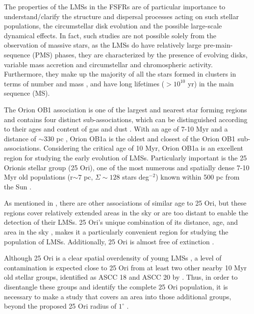 \documentclass[12pt]{article}
\begin{document}
The properties of the LMSs in the FSFRs are of particular importance to understand/clarify the structure and dispersal processes acting on such stellar populations, the circumstellar disk evolution and the possible large-scale dynamical effects. In fact, such studies are not possible solely from the observation of massive stars, as the LMSs do have relatively large pre-main-sequence (PMS) phases, they are characterized by the presence of evolving disks, variable mass accretion and circumstellar and chromospheric activity. Furthermore, they make up the majority of all the stars formed in clusters in terms of number and mass \citep[e.g.,][]{Bastian2010}, and have long lifetimes ($>10^{10}$ yr) in the main sequence (MS).

The Orion OB1 association is one of the largest and nearest star forming regions \citep[e.g. ][]{Genzel-Stutzki1989,Bally2008,Briceno2008} and contains four distinct sub-associations, which can be distinguished according to their ages and content of gas and dust \citep{Blaauw1964}. With an age of 7-10 Myr and a distance of $\sim$330 pc \citep[e.g.,][]{Briceno2005}, Orion OB1a is the oldest and closest of the Orion OB1 sub-associations. Considering the critical age of 10 Myr, Orion OB1a is an excellent region for studying the early evolution of LMSs. Particularly important is the 25 Orionis stellar group (25 Ori), one of the most numerous and spatially dense 7-10 Myr old populations (r$\sim7$ pc, $\Sigma \sim 128$ stars deg$^{-2}$) known within 500 pc from the Sun \citep{Briceno2007}. 

As mentioned in \citet{Downes2014}, there are other associations of similar age to 25 Ori, but these regions cover relatively extended areas in the sky or are too distant to enable the detection of their LMSs. 25 Ori's unique combination of its distance, age, and area in the sky \citep[360 pc, $\sim7$ Myr, and $\approx 3$ deg$^2$; ][]{Briceno2005,Briceno2007,Downes2014}, makes it a particularly convenient region for studying the population of LMSs. Additionally, 25 Ori is almost free of extinction \citep[$A_V\approx0.30$ mag.; ][]{Kharchenko2005,Briceno2005,Briceno2007,Downes2014}.

Although 25 Ori is a clear spatial overdensity of young LMSs \citep{Briceno2007,Downes2014}, a level of contamination is expected close to 25 Ori from at least two other nearby 10 Myr old stellar groups, identified as ASCC 18 and ASCC 20 by \citet{Kharchenko2005,Kharchenko2013}. Thus, in order to disentangle these groups and identify the complete 25 Ori population, it is necessary to make a study that covers an area into those additional groups, beyond the proposed 25 Ori radius of $1^\circ$ \citep{Briceno2005,Briceno2007}.
\end{document}
